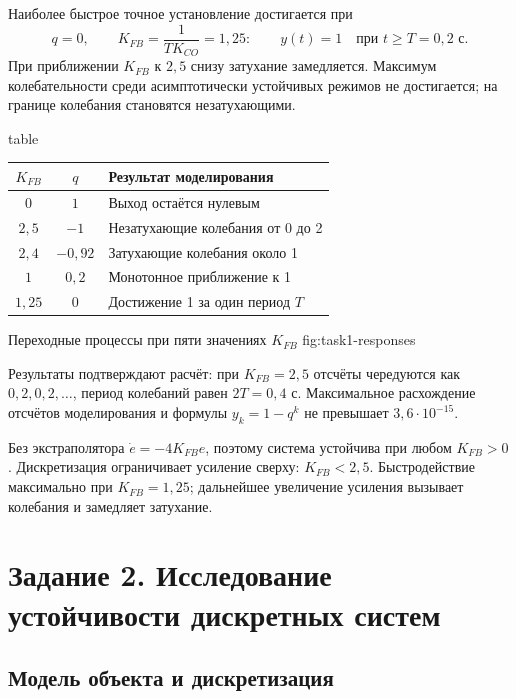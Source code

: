 Наиболее быстрое точное установление достигается при
\[
  q=0,\qquad K_{FB}=\frac{1}{TK_{CO}}=1{,}25:
  \qquad y(t)=1\quad\text{при }t\geq T=0{,}2\text{ с}.
\]
При приближении $K_{FB}$ к $2{,}5$ снизу затухание замедляется.
Максимум колебательности среди асимптотически устойчивых режимов
не достигается; на границе колебания становятся незатухающими.

\begin{reportblock}{table}
  \caption{Исследованные режимы}
  \label{tab:task1-gain}
  \begin{tabularx}{0.95\textwidth}{c c X}
    \toprule
    $K_{FB}$ & $q$ & Результат моделирования \\
    \midrule
    $0$ & $1$ & Выход остаётся нулевым \\
    $2{,}5$ & $-1$ & Незатухающие колебания от 0 до 2 \\
    $2{,}4$ & $-0{,}92$ & Затухающие колебания около 1 \\
    $1$ & $0{,}2$ & Монотонное приближение к 1 \\
    $1{,}25$ & $0$ & Достижение 1 за один период $T$ \\
    \bottomrule
  \end{tabularx}
\end{reportblock}

  {Переходные процессы при пяти значениях $K_{FB}$}
  {fig:task1-responses}

Результаты подтверждают расчёт: при $K_{FB}=2{,}5$ отсчёты
чередуются как $0,2,0,2,\ldots$, период колебаний равен $2T=0{,}4$ с.
Максимальное расхождение отсчётов моделирования и формулы $y_k=1-q^k$
не превышает $3{,}6\cdot10^{-15}$.

Без экстраполятора $\dot e=-4K_{FB}e$, поэтому система устойчива
при любом $K_{FB}>0$. Дискретизация ограничивает усиление сверху:
$K_{FB}<2{,}5$. Быстродействие максимально при $K_{FB}=1{,}25$;
дальнейшее увеличение усиления вызывает колебания и замедляет затухание.

\clearpage
\section{Задание 2. Исследование устойчивости дискретных систем}

\subsection{Модель объекта и дискретизация}

